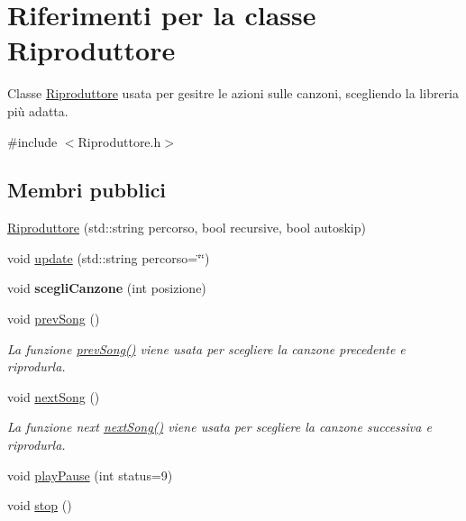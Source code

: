 \hypertarget{classRiproduttore}{\section{\-Riferimenti per la classe \-Riproduttore}
\label{classRiproduttore}
}


\-Classe \hyperlink{classRiproduttore}{\-Riproduttore} usata per gesitre le azioni sulle canzoni, scegliendo la libreria più adatta.  




{\ttfamily \#include $<$\-Riproduttore.\-h$>$}

\subsection*{\-Membri pubblici}
\begin{DoxyCompactItemize}
\item 
\hyperlink{classRiproduttore_ab01a4e52bcc2735e94f547b32906f3a2}{\-Riproduttore} (std\-::string percorso, bool recursive, bool autoskip)
\item 
void \hyperlink{classRiproduttore_ae264ca70ff75d625fb9d41e8117cd800}{update} (std\-::string percorso=\char`\"{}\char`\"{})
\item 
\hypertarget{classRiproduttore_ac7d914e4ef1e08413aa452b5bd19ee36}{void {\bfseries scegli\-Canzone} (int posizione)}\label{classRiproduttore_ac7d914e4ef1e08413aa452b5bd19ee36}

\item 
void \hyperlink{classRiproduttore_a6bb45ff25c5a3b9ffcf9203214f13340}{prev\-Song} ()
\begin{DoxyCompactList}\small\item\em \-La funzione \hyperlink{classRiproduttore_a6bb45ff25c5a3b9ffcf9203214f13340}{prev\-Song()} viene usata per scegliere la canzone precedente e riprodurla. \end{DoxyCompactList}\item 
\hypertarget{classRiproduttore_ab8a211727d84256bc62ab841881ee9c3}{void \hyperlink{classRiproduttore_ab8a211727d84256bc62ab841881ee9c3}{next\-Song} ()}\label{classRiproduttore_ab8a211727d84256bc62ab841881ee9c3}

\begin{DoxyCompactList}\small\item\em \-La funzione next \hyperlink{classRiproduttore_ab8a211727d84256bc62ab841881ee9c3}{next\-Song()} viene usata per scegliere la canzone successiva e riprodurla. \end{DoxyCompactList}\item 
void \hyperlink{classRiproduttore_a0e1a448f370d517dbe2ed75f1f097abf}{play\-Pause} (int status=9)
\item 
\hypertarget{classRiproduttore_a837bea01fa68487694b661ec94781f5d}{void \hyperlink{classRiproduttore_a837bea01fa68487694b661ec94781f5d}{stop} ()}\label{classRiproduttore_a837bea01fa68487694b661ec94781f5d}


\end{DoxyCompactItemize}
